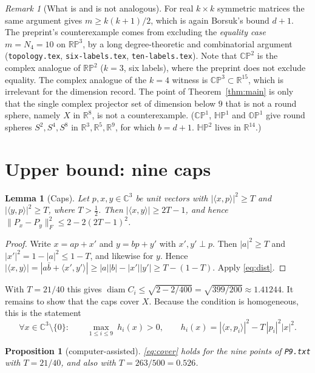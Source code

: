 \documentclass[11pt]{amsart}
\newtheorem{lemma}[theorem]{Lemma}
\newtheorem{proposition}[theorem]{Proposition}
\theoremstyle{remark}
\newtheorem{remark}[theorem]{Remark}
\newcommand{\C}{\mathbb C}
\newcommand{\R}{\mathbb R}
\newcommand{\CP}{\mathbb{CP}}
\DeclareMathOperator{\diam}{diam}
\begin{document}
\begin{remark}[What is and is not analogous]
For real $k\times k$ symmetric matrices the same argument gives $m\ge k(k+1)/2$,
which is again Borsuk's bound $d+1$. The preprint's counterexample comes from
excluding the \emph{equality case} $m=N_4=10$ on $\mathbb{RP}^3$, by a long
degree-theoretic and combinatorial argument (\texttt{topology.tex},
\texttt{six-labels.tex}, \texttt{ten-labels.tex}). Note that $\CP^2$ is the complex
analogue of $\mathbb{RP}^2$ ($k=3$, six labels), where the preprint does not exclude
equality. The complex analogue of the $k=4$ witness is $\CP^3\subset\R^{15}$, which
is irrelevant for the dimension record. The point of Theorem~\ref{thm:main} is only that the
single complex projector set of dimension below $9$ that is not a round sphere,
namely $X$ in $\R^8$, is not a counterexample. ($\CP^1$, $\mathbb{HP}^1$ and $\mathbb{OP}^1$ give round
spheres $S^2,S^4,S^8$ in $\R^3,\R^5,\R^9$, for which $b=d+1$. $\mathbb{HP}^2$ lives in $\R^{14}$.)
\end{remark}

\section{Upper bound: nine caps}
\begin{lemma}[Caps]\label{lem:cap}
Let $p,x,y\in\C^3$ be unit vectors with $|\langle x,p\rangle|^2\ge T$ and
$|\langle y,p\rangle|^2\ge T$, where $T>\tfrac12$. Then
$|\langle x,y\rangle|\ge 2T-1$, and hence
$\|P_x-P_y\|_F^2\le 2-2(2T-1)^2$.
\end{lemma}
\begin{proof}
Write $x=ap+x'$ and $y=bp+y'$ with $x',y'\perp p$. Then $|a|^2\ge T$ and $|x'|^2=1-|a|^2\le1-T$,
and likewise for $y$. Hence $|\langle x,y\rangle|=|a\bar b+\langle x',y'\rangle|\ge|a||b|-|x'||y'|\ge
T-(1-T)$. Apply \eqref{eq:dist}.
\end{proof}

With $T=21/40$ this gives $\diam C_i\le\sqrt{2-2/400}=\sqrt{399/200}\approx1.41244$.
It remains to show that the caps cover $X$. Because the condition is
homogeneous, this is the statement
\begin{equation}\label{eq:cover}
 \forall x\in\C^3\setminus\{0\}:\qquad
 \max_{1\le i\le 9}\ h_i(x)>0,\qquad
 h_i(x)=|\langle x,p_i\rangle|^2-T\,|p_i|^2|x|^2 .
\end{equation}

\begin{proposition}[computer-assisted]\label{prop:cert}
\eqref{eq:cover} holds for the nine points of \texttt{P9.txt} with $T=21/40$,
and also with $T=263/500=0.526$.
\end{proposition}
\end{document}
